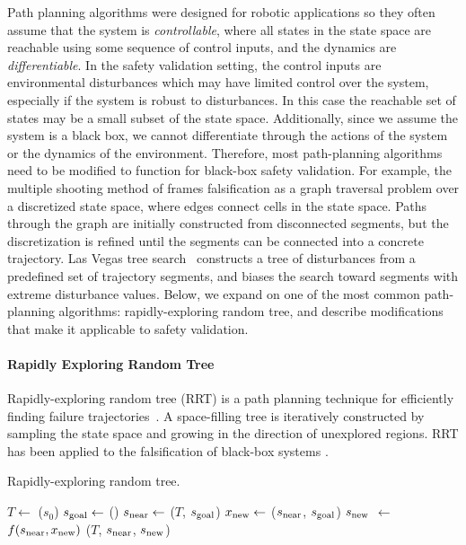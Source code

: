 Path planning algorithms were designed for robotic applications so they often assume that the system is \emph{controllable}, where all states in the state space are reachable using some sequence of control inputs, and the dynamics are \emph{differentiable}. In the safety validation setting, the control inputs are environmental disturbances which may have limited control over the system, especially if the system is robust to disturbances. In this case the reachable set of states may be a small subset of the state space. Additionally, since we assume the system is a black box, we cannot differentiate through the actions of the system or the dynamics of the environment. Therefore, most path-planning algorithms need to be modified to function for black-box safety validation. For example, the multiple shooting method of \textcite{zutshi2014multiple} frames falsification as a graph traversal problem over a discretized state space, where edges connect cells in the state space. Paths through the graph are initially constructed from disconnected segments, but the discretization is refined until the segments can be connected into a concrete trajectory. Las Vegas tree search~\cite{ernst2019fast} constructs a tree of disturbances from a predefined set of trajectory segments, and biases the search toward segments with extreme disturbance values. Below, we expand on one of the most common path-planning algorithms: rapidly-exploring random tree, and describe modifications that make it applicable to safety validation. 

\paragraph{Rapidly Exploring Random Tree} Rapidly-exploring random tree (RRT) is a path planning technique for efficiently finding failure trajectories~\cite{lavalle1998rapidly}. A space-filling tree is iteratively constructed by sampling the state space and growing in the direction of unexplored regions. RRT has been applied to the falsification of black-box systems \cite{esposito2004adaptive,kim2005rrt,branicky2006sampling,dang2008sensitive,Nahhal2007Test,plaku2009hybrid,dreossi2015efficient,tuncali2019rapidly,koschi2019computationally}.

\begin{algorithm}
\caption{Rapidly-exploring random tree.} \label{alg:rrt}
\begin{algorithmic}[1]
    \State $T \gets$ ($s_0$)
    \Loop
        \State $s_{\rm goal} \gets$ () \label{line:rrt_sample_state}
        \State $s_{\rm near} \gets$ ($T$, $s_{\rm goal}$) \label{line:rrt_nearest_neighbor}
        \State $x_{\rm new} \gets $ ($s_{\rm near}$, $s_{\rm goal}$) \label{line:rrt_optimal_input}
        \State $s_{\rm new}$ $\gets$ $f(s_{\rm near}, x_{\rm new})$ \label{line:rrt_simulate}
        \State {}($T$, $s_{\rm near} $, $s_{\rm new}$) \label{line:rrt_add_new}
    \EndLoop
    \State {}
    \EndFunction
\end{algorithmic}
\end{algorithm}

